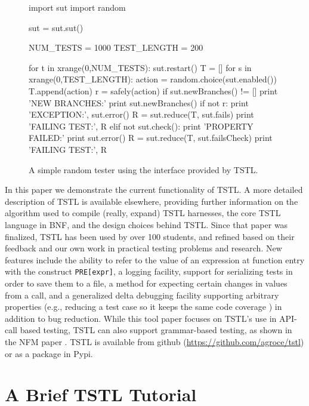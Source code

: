 \documentclass{sig-alternate}
\begin{document}
\begin{figure}
\begin{code}
import sut
import random

sut = sut.sut()

NUM\_TESTS = 1000
TEST\_LENGTH = 200 

for t in xrange(0,NUM\_TESTS):
   sut.restart()
   T = []
   for s in xrange(0,TEST\_LENGTH): 
       action = random.choice(sut.enabled())
       T.append(action)
       r = safely(action)
       if sut.newBranches() != []
          print 'NEW BRANCHES:'
          print sut.newBranches()
       if not r:
          print 'EXCEPTION:', sut.error() 
          R = sut.reduce(T, sut.fails) 
          print 'FAILING TEST:', R
       elif not sut.check():
          print 'PROPERTY FAILED:'
          print sut.error()  
          R = sut.reduce(T, sut.failsCheck) 
          print 'FAILING TEST:', R
\end{code}
\caption{A simple random tester using the interface provided by TSTL.}
\label{fig:rt}
\end{figure}

In this paper we demonstrate the current functionality of TSTL.  A
more detailed description of TSTL \cite{NFM15} is available elsewhere,
providing further information on the algorithm used to compile
(really, expand) TSTL harnesses, the core TSTL language in BNF, and
the design choices behind TSTL.  Since that paper was finalized, TSTL
has been used by over 100 students, and refined based on their
feedback and our own work in practical testing problems and research.
New features include the ability to refer to the value of an
expression at function entry with the construct {\tt PRE[expr]}, a
logging facility, support for serializing tests in order to save them
to a file, a method for expecting certain changes in values from a
call, and a generalized delta debugging \cite{DD} facility supporting
arbitrary properties (e.g., reducing a test case so it keeps the same
code coverage \cite{icst2014}) in addition to bug reduction.  While
this tool paper focuses on TSTL's use in API-call based testing, TSTL
can also support grammar-based testing, as shown in the NFM paper
\cite{NFM15}.  TSTL is available from github
(\url{https://github.com/agroce/tstl}) or as a package in Pypi.

\section{A Brief TSTL Tutorial}
\end{document}
